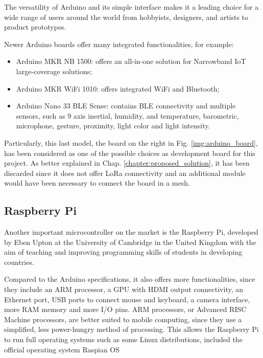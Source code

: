 			The versatility of Arduino and its simple interface makes it a leading choice for a wide range of users around the world from hobbyists, designers, and artists to product prototypes. 
			
			Newer Arduino boards offer many integrated functionalities, for example:
			\begin{itemize}[noitemsep]
				\item Arduino MKR NB 1500: offers an all-in-one solution for Narrowband IoT large-coverage solutions;
				\item Arduino MKR WiFi 1010: offers integrated WiFi and Bluetooth;
				\item Arduino Nano 33 BLE Sense: contains BLE connectivity and multiple sensors, such as 9 axis inertial, humidity, and temperature, barometric, microphone, gesture, proximity, light color and light intensity.
			\end{itemize}
		

			Particularly, this last model, the board on the right in Fig. \ref{img:arduino_board}, has been considered as one of the possible choices as development board for this project.
			As better explained in Chap. \ref{chapter:proposed_solution}, it has been discarded since it does not offer LoRa connectivity and an additional module would have been necessary to connect the board in a mesh.
								
		\subsection{Raspberry Pi}
	
			Another important microcontroller on the market is the Raspberry Pi, developed by Eben Upton at the University of Cambridge in the United Kingdom with the aim of teaching and improving programming skills of students in developing countries.
			
			Compared to the Arduino specifications, it also offers more functionalities, since they include an ARM processor, a GPU with HDMI output connectivity, an Ethernet port, USB ports to connect mouse and keyboard, a camera interface, more RAM memory and more I/O pins.
			ARM processors, or Advanced RISC Machine processors, are better suited to mobile computing, since they use a simplified, less power-hungry method of processing.
			This allows the Raspberry Pi to run full operating systems such as some Linux distributions, included the official operating system Raspian OS
			
